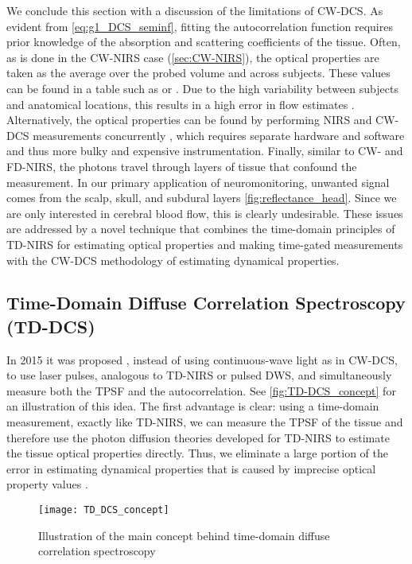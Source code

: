 We conclude this section with a discussion of the limitations of CW-DCS. As evident from \autoref{eq:g1_DCS_seminf}, fitting the autocorrelation function requires prior knowledge of the absorption and scattering coefficients of the tissue. Often, as is done in the CW-NIRS case (\autoref{sec:CW-NIRS}), the optical properties are taken as the average over the probed volume and across subjects. These values can be found in a table such as \cite[ch. 5]{Handbook} or \cite[ch. 1]{Madsen2013}. Due to the high variability between subjects and anatomical locations, this results in a high error in flow estimates \cite{Irwin2011}. Alternatively, the optical properties can be found by performing NIRS and CW-DCS measurements concurrently \cite{Cheung2001}, which requires separate hardware and software and thus more bulky and expensive instrumentation. Finally, similar to CW- and FD-NIRS, the photons travel through layers of tissue that confound the measurement. In our primary application of neuromonitoring, unwanted signal comes from the scalp, skull, and subdural layers \autoref{fig:reflectance_head}. Since we are only interested in cerebral blood flow, this is clearly undesirable. These issues are addressed by a novel technique that combines the time-domain principles of TD-NIRS for estimating optical properties and making time-gated measurements with the CW-DCS methodology of estimating dynamical properties.


\subsection{Time-Domain Diffuse Correlation Spectroscopy (TD-DCS)} \label{sec:TD-DCS}
In 2015 it was proposed \cite{TDDCSpatent}, instead of using continuous-wave light as in CW-DCS, to use laser pulses, analogous to TD-NIRS or pulsed DWS, and simultaneously measure both the TPSF and the autocorrelation. See \autoref{fig:TD-DCS_concept} for an illustration of this idea. The first advantage is clear: using a time-domain measurement, exactly like TD-NIRS, we can measure the TPSF of the tissue and therefore use the photon diffusion theories developed for TD-NIRS to estimate the tissue optical properties directly. Thus, we eliminate a large portion of the error in estimating dynamical properties that is caused by imprecise optical property values \cite{Sutin2016}.

\begin{figure}[tb]
    \centering
    \texttt{[image: TD\_DCS\_concept]}
    \caption{Illustration of the main concept behind time-domain diffuse correlation spectroscopy}
    \label{fig:TD-DCS_concept}
\end{figure}

